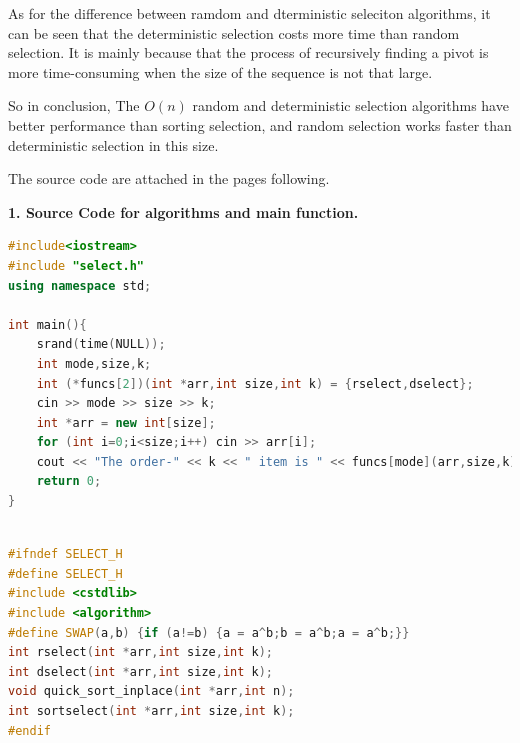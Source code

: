 \documentclass{article}
\begin{document}
As for the difference between ramdom and dterministic seleciton algorithms, it can be seen that the deterministic selection costs more time than random selection. It is mainly because that the process of recursively finding a pivot is more time-consuming when the size of the sequence is not that large.

So in conclusion, The $O(n)$ random and deterministic selection algorithms have better performance than sorting selection, and random selection works faster than deterministic selection in this size.

The source code are attached in the pages following.

\newpage

{\bf 1. Source Code for algorithms and main function.}
\begin{lstlisting}[title=main.cpp,language=C++]
#include<iostream>
#include "select.h"
using namespace std;

int main(){
    srand(time(NULL));
    int mode,size,k;
    int (*funcs[2])(int *arr,int size,int k) = {rselect,dselect};
    cin >> mode >> size >> k;
    int *arr = new int[size];
    for (int i=0;i<size;i++) cin >> arr[i];
    cout << "The order-" << k << " item is " << funcs[mode](arr,size,k) << endl;
    return 0;
}
    
\end{lstlisting}
\begin{lstlisting}[title=select.h,language=C++]
#ifndef SELECT_H
#define SELECT_H
#include <cstdlib>
#include <algorithm>
#define SWAP(a,b) {if (a!=b) {a = a^b;b = a^b;a = a^b;}}
int rselect(int *arr,int size,int k);
int dselect(int *arr,int size,int k);
void quick_sort_inplace(int *arr,int n);
int sortselect(int *arr,int size,int k);
#endif

\end{lstlisting}
\end{document}
